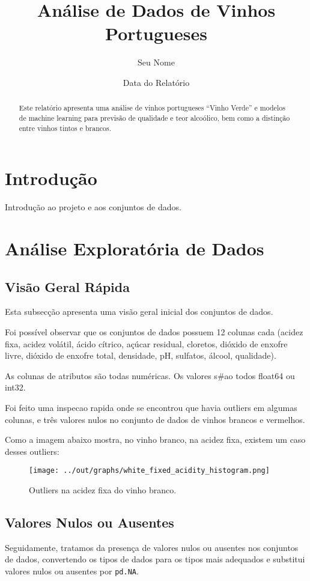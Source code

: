 \documentclass{article}
\title{Análise de Dados de Vinhos Portugueses}
\author{Seu Nome}
\date{Data do Relatório}
\begin{document}
\maketitle

\begin{abstract}
Este relatório apresenta uma análise de vinhos portugueses ``Vinho Verde'' e modelos de machine learning para previsão de qualidade e teor alcoólico, bem como a distinção entre vinhos tintos e brancos.
\end{abstract}

\section{Introdução}
Introdução ao projeto e aos conjuntos de dados.

\section{Análise Exploratória de Dados}

\subsection{Visão Geral Rápida}
Esta subsecção apresenta uma visão geral inicial dos conjuntos de dados.

Foi possível observar que os conjuntos de dados possuem 12 colunas cada (acidez fixa, acidez volátil, ácido cítrico, açúcar residual, cloretos, dióxido de enxofre livre, dióxido de enxofre total, densidade, pH, sulfatos, álcool, qualidade).

As colunas de atributos são todas numéricas. Os valores s#ao todos float64 ou int32.

Foi feito uma inspecao rapida onde se encontrou que havia outliers em algumas colunas, e três valores nulos no conjunto de dados de vinhos brancos e vermelhos.

Como a imagem abaixo mostra, no vinho branco, na acidez fixa, existem um caso desses outliers:

\begin{figure}[ht]
  \centering
  \texttt{[image: ../out/graphs/white\_fixed\_acidity\_histogram.png]}
  \caption{Outliers na acidez fixa do vinho branco.}
  \label{fig:outliers_white_fixed_acidity}
\end{figure}

\subsection{Valores Nulos ou Ausentes}
Seguidamente, tratamos da presença de valores nulos ou ausentes nos conjuntos de dados, convertendo os tipos de dados para os tipos mais adequados e substitui valores nulos ou ausentes por \texttt{pd.NA}.
\end{document}
